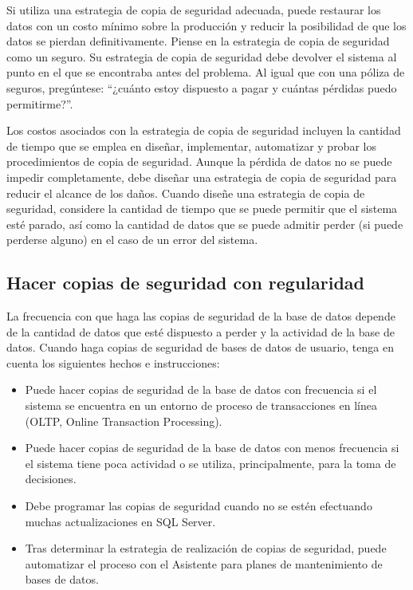 Si utiliza una estrategia de copia de seguridad adecuada, puede restaurar los datos con un costo mínimo sobre la producción y reducir la posibilidad de que los datos se pierdan definitivamente. Piense en la estrategia de copia de seguridad como un seguro. Su estrategia de copia de seguridad debe devolver el sistema al punto en el que se encontraba antes del problema. Al igual que con una póliza de seguros, pregúntese: “¿cuánto estoy dispuesto a pagar y cuántas pérdidas puedo permitirme?”.

Los costos asociados con la estrategia de copia de seguridad incluyen la cantidad de tiempo que se emplea en diseñar, implementar, automatizar y probar los procedimientos de copia de seguridad. Aunque la pérdida de datos no se puede impedir completamente, debe diseñar una estrategia de copia de seguridad para reducir el alcance de los daños. Cuando diseñe una estrategia de copia de seguridad, considere la cantidad de tiempo que se puede permitir que el sistema esté parado, así como la cantidad de datos que se puede admitir perder (si puede perderse alguno) en el caso de un error del sistema.

    
\subsection{Hacer copias de seguridad con regularidad}  
La frecuencia con que haga las copias de seguridad de la base de datos depende de la cantidad de datos que esté dispuesto a perder y la actividad de la base de datos. Cuando haga copias de seguridad de bases de datos de usuario, tenga en cuenta los siguientes hechos e instrucciones:





\begin{itemize}
\item 
 Puede hacer copias de seguridad de la base de datos con frecuencia si el sistema se encuentra en un entorno de proceso de transacciones en línea (OLTP, Online Transaction Processing).

\item 
Puede hacer copias de seguridad de la base de datos con menos frecuencia si el sistema tiene poca actividad o se utiliza, principalmente, para la toma de decisiones.

\item 
Debe programar las copias de seguridad cuando no se estén efectuando muchas actualizaciones en SQL Server.
 
\item 
Tras determinar la estrategia de realización de copias de seguridad, puede automatizar el proceso con el Asistente para planes de mantenimiento de bases de datos.
\end{itemize}




